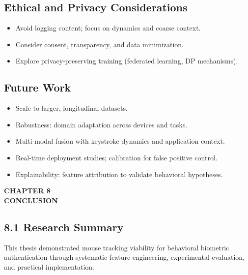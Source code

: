 \documentclass[
  11pt,
  a4paper,
]{article}
\providecommand{\tightlist}{%
  \setlength{\itemsep}{0pt}\setlength{\parskip}{0pt}}
\begin{document}
\subsection{Ethical and Privacy
Considerations}\label{ethical-and-privacy-considerations}

\begin{itemize}
\tightlist
\item
  Avoid logging content; focus on dynamics and coarse context.
\item
  Consider consent, transparency, and data minimization.
\item
  Explore privacy-preserving training (federated learning, DP
  mechanisms).
\end{itemize}

\subsection{Future Work}\label{future-work}

\begin{itemize}
\tightlist
\item
  Scale to larger, longitudinal datasets.
\item
  Robustness: domain adaptation across devices and tasks.
\item
  Multi-modal fusion with keystroke dynamics and application context.
\item
  Real-time deployment studies; calibration for false positive control.
\item
  Explainability: feature attribution to validate behavioral hypotheses.
\end{itemize}

\newpage
\thispagestyle{plain}

\begin{center}
\vspace*{2cm}
\textbf{\Large CHAPTER 8}\\[0.5cm]
\textbf{\Large CONCLUSION}
\end{center}

\newpage

\subsection{8.1 Research Summary}\label{research-summary}

This thesis demonstrated mouse tracking viability for behavioral
biometric authentication through systematic feature engineering,
experimental evaluation, and practical implementation.
\end{document}
